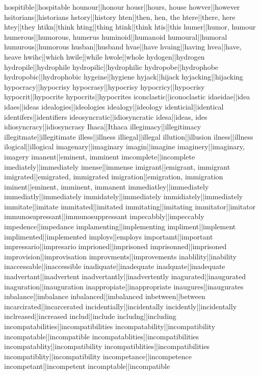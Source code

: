 hospitible||hospitable
hounour||honour
housr||hours, house
howver||however
hsitorians||historians
hstory||history
hten||then, hen, the
htere||there, here
htey||they
htikn||think
hting||thing
htink||think
htis||this
humer||humor, humour
humerous||humorous, humerus
huminoid||humanoid
humoural||humoral
humurous||humorous
husban||husband
hvae||have
hvaing||having
hvea||have, heave
hwihc||which
hwile||while
hwole||whole
hydogen||hydrogen
hydropile||hydrophile
hydropilic||hydrophilic
hydropobe||hydrophobe
hydropobic||hydrophobic
hygeine||hygiene
hyjack||hijack
hyjacking||hijacking
hypocracy||hypocrisy
hypocrasy||hypocrisy
hypocricy||hypocrisy
hypocrit||hypocrite
hypocrits||hypocrites
iconclastic||iconoclastic
idaeidae||idea
idaes||ideas
idealogies||ideologies
idealogy||ideology
identicial||identical
identifers||identifiers
ideosyncratic||idiosyncratic
idesa||ideas, ides
idiosyncracy||idiosyncrasy
Ihaca||Ithaca
illegimacy||illegitimacy
illegitmate||illegitimate
illess||illness
illiegal||illegal
illution||illusion
ilness||illness
ilogical||illogical
imagenary||imaginary
imagin||imagine
imaginery||imaginary, imagery
imanent||eminent, imminent
imcomplete||incomplete
imediately||immediately
imense||immense
imigrant||emigrant, immigrant
imigrated||emigrated, immigrated
imigration||emigration, immigration
iminent||eminent, imminent, immanent
immediatley||immediately
immediatly||immediately
immidately||immediately
immidiately||immediately
immitate||imitate
immitated||imitated
immitating||imitating
immitator||imitator
immunosupressant||immunosuppressant
impecabbly||impeccably
impedence||impedance
implamenting||implementing
impliment||implement
implimented||implemented
imploys||employs
importamt||important
impressario||impresario
imprioned||imprisoned
imprisonned||imprisoned
improvision||improvisation
improvments||improvements
inablility||inability
inaccessable||inaccessible
inadiquate||inadequate
inadquate||inadequate
inadvertant||inadvertent
inadvertantly||inadvertently
inagurated||inaugurated
inaguration||inauguration
inappropiate||inappropriate
inaugures||inaugurates
inbalance||imbalance
inbalanced||imbalanced
inbetween||between
incarcirated||incarcerated
incidentially||incidentally
incidently||incidentally
inclreased||increased
includ||include
includng||including
incompatabilities||incompatibilities
incompatability||incompatibility
incompatable||incompatible
incompatablities||incompatibilities
incompatablity||incompatibility
incompatiblities||incompatibilities
incompatiblity||incompatibility
incompetance||incompetence
incompetant||incompetent
incomptable||incompatible
